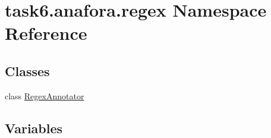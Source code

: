 \hypertarget{namespacetask6_1_1anafora_1_1regex}{}\section{task6.\+anafora.\+regex Namespace Reference}
\label{namespacetask6_1_1anafora_1_1regex}
\subsection*{Classes}
\begin{DoxyCompactItemize}
\item 
class \hyperlink{classtask6_1_1anafora_1_1regex_1_1RegexAnnotator}{Regex\+Annotator}
\end{DoxyCompactItemize}
\subsection*{Variables}
